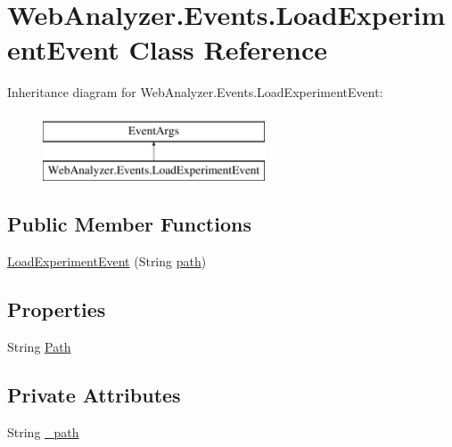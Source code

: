 \hypertarget{class_web_analyzer_1_1_events_1_1_load_experiment_event}{}\section{Web\+Analyzer.\+Events.\+Load\+Experiment\+Event Class Reference}
\label{class_web_analyzer_1_1_events_1_1_load_experiment_event}
Inheritance diagram for Web\+Analyzer.\+Events.\+Load\+Experiment\+Event\+:\begin{figure}[H]
\begin{center}
\leavevmode
\includegraphics[height=2.000000cm]{class_web_analyzer_1_1_events_1_1_load_experiment_event}
\end{center}
\end{figure}
\subsection*{Public Member Functions}
\begin{DoxyCompactItemize}
\item 
\hyperlink{class_web_analyzer_1_1_events_1_1_load_experiment_event_a359c2a5d88c60ad3f993c43984b375a9}{Load\+Experiment\+Event} (String \hyperlink{_u_i_2_h_t_m_l_resources_2js_2src_2create__experiment_8js_aa72e0c8a20e6bcc571d3a1c51846e627}{path})
\end{DoxyCompactItemize}
\subsection*{Properties}
\begin{DoxyCompactItemize}
\item 
String \hyperlink{class_web_analyzer_1_1_events_1_1_load_experiment_event_ac86cf22d02cb0c13c9ea9437422b5142}{Path}
\end{DoxyCompactItemize}
\subsection*{Private Attributes}
\begin{DoxyCompactItemize}
\item 
String \hyperlink{class_web_analyzer_1_1_events_1_1_load_experiment_event_ae8805e9e6076aad4f485c959c9f7eb54}{\+\_\+path}
\end{DoxyCompactItemize}


